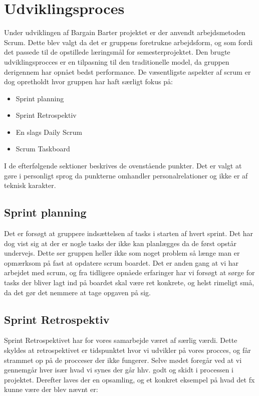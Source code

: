 \chapter{Udviklingsproces}

Under udviklingen af Bargain Barter projektet er der anvendt arbejdsmetoden Scrum. Dette blev valgt da det er gruppens foretrukne arbejdsform, og som fordi det passede til de opstillede læringsmål for semesterprojektet. Den brugte udviklingsprocces er en tilpasning til den traditionelle model, da gruppen derigennem har opnået bedst performance. De væsentligste aspekter af scrum er dog opretholdt hvor gruppen har haft særligt fokus på:

\begin{itemize}
		\item Sprint planning
		\item Sprint Retrospektiv
		\item En slags Daily Scrum
		\item Scrum Taskboard
	\end{itemize}

I de efterfølgende sektioner beskrives de ovenstående punkter. Det er valgt at gøre i personligt sprog da punkterne omhandler personalrelationer og ikke er af teknisk karakter. 

\section{Sprint planning}
Det er forsøgt at gruppere indsættelsen af tasks i starten af hvert sprint. Det har dog vist sig at der er nogle tasks der ikke kan planlægges da de først opstår undervejs. Dette ser gruppen heller ikke som noget problem så længe man er opmærksom på fast at opdatere scrum boardet. Det er anden gang at vi har arbejdet med scrum, og fra tidligere opnåede erfaringer har vi forsøgt at sørge for tasks der bliver lagt ind på boardet skal være ret konkrete, og helst rimeligt små, da det gør det nemmere at tage opgaven på sig.  


\section{Sprint Retrospektiv}
Sprint Retrospektivet har for vores samarbejde været af særlig værdi. Dette skyldes at retrospektivet er tidspunktet hvor vi udvikler på vores procces, og får strammet op på de procceser der ikke fungerer. Selve mødet foregår ved at vi gennemgår hver især hvad vi synes der går hhv. godt og skidt i processen i projektet. Derefter laves der en opsamling, og et konkret eksempel på hvad det fx kunne være der blev nævnt er:


